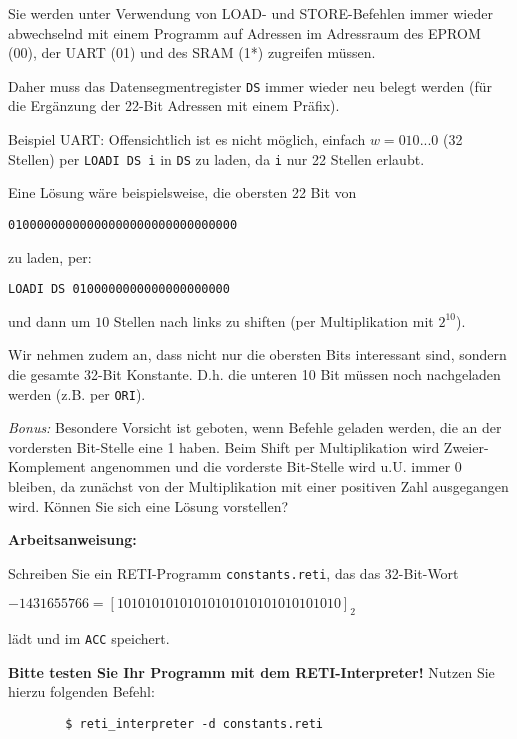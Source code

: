 \begin{exercise}
	Sie werden unter Verwendung von LOAD- und STORE-Befehlen immer wieder
	abwechselnd mit einem Programm auf Adressen im Adressraum des EPROM (00), der 
	UART (01) und des SRAM (1*)	zugreifen müssen.
	
	Daher muss das Datensegmentregister \verb_DS_ immer wieder neu belegt werden 
	(für die Ergänzung der 22-Bit Adressen mit einem Präfix). 
	
	Beispiel UART: Offensichtlich ist es nicht möglich, einfach $w = 010...0$ (32 Stellen)
	per \texttt{LOADI DS i} in \texttt{DS} zu laden, da \texttt{i} nur 22 Stellen erlaubt.

	Eine Lösung wäre beispielsweise, die obersten 22 Bit von 

	{\color{red}\verb_0100000000000000000000_}\verb_0000000000_

	zu laden, per:

	\verb_LOADI DS _{\color{red}\verb_0100000000000000000000_}

	und dann um $10$ Stellen nach links zu shiften (per Multiplikation mit $2^{10}$).

	Wir nehmen zudem an, dass nicht nur die obersten Bits interessant sind,
	sondern die gesamte 32-Bit Konstante.
	D.h. die unteren 10 Bit müssen noch nachgeladen werden (z.B. per \texttt{ORI}).

	\emph{Bonus:} Besondere Vorsicht ist geboten, wenn Befehle geladen werden,
	die an der vordersten Bit-Stelle eine 1 haben. Beim Shift per Multiplikation wird 
	Zweier-Komplement angenommen und die vorderste Bit-Stelle wird u.U. immer 0 bleiben,
	da zunächst von der Multiplikation mit einer positiven Zahl ausgegangen wird.
	Können Sie sich eine Lösung vorstellen?

	\textbf{Arbeitsanweisung:}

	Schreiben Sie ein RETI-Programm \texttt{constants.reti}, das das 32-Bit-Wort 
	
	$-1431655766 = [10101010101010101010101010101010]_2$

	lädt und im \texttt{ACC} speichert.

	\textbf{Bitte testen Sie Ihr Programm mit dem RETI-Interpreter!} Nutzen Sie hierzu folgenden Befehl:
	\begin{verbatim}
		$ reti_interpreter -d constants.reti
	\end{verbatim}

\end{exercise}

